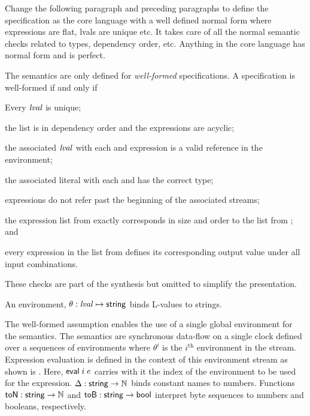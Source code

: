 Change the following paragraph and preceding paragraphs to define the specification as the core language with a well defined normal form where expressions are flat, lvals are unique etc. It takes care of all the normal semantic checks related to types, dependency order, etc. Anything in the core language has normal form and is perfect.

The semantics are only defined for \emph{well-formed} specifications. A specification is well-formed if and only if
\begin{compactenum}
\item Every $\mathit{lval}$ is unique;
\item the  list is in dependency order and the expressions are acyclic;
\item the associated $\mathit{lval}$ with each  and  expression is a valid reference in the environment;
\item the associated literal with each  and  has the correct type;
\item {} expressions do not refer past the beginning of the associated streams;
\item the expression list from  exactly corresponds in size and order to the list from ; and
\item every expression in the list from  defines its corresponding output value under all input combinations.
\end{compactenum}
These checks are part of the synthesis but omitted to simplify the presentation.

An environment, $\theta: \mathit{lval} \mapsto \mathsf{string}$ binds L-values to strings. 

The well-formed assumption enables the use of a single global environment for the semantics. The semantics are synchronous data-flow on a single clock defined over a sequences of environments where $\theta^i$ is the $i^\mathrm{th}$ environment in the stream. Expression evaluation is defined in the context of this environment stream as shown is . Here, $\mathsf{eval}\; i\; e$ carries with it the index of the environment to be used for the expression. $\Delta : \mathsf{string} \to \mathbb{N}$ binds constant names to numbers. Functions $\mathsf{toN}:\mathsf{string}\to\mathbb{N}$ and $\mathsf{toB}:\mathsf{string}\to\mathsf{bool}$ interpret byte sequences to numbers and booleans, respectively. 

